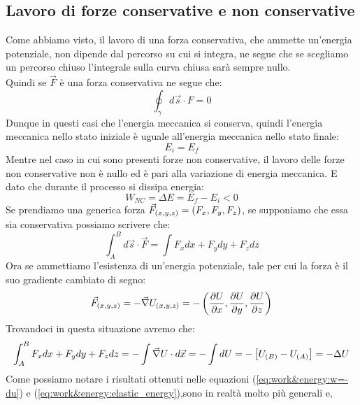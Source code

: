 \subsection{Lavoro di forze conservative e non conservative}
Come abbiamo visto, il lavoro di una forza conservativa, che ammette
un'energia potenziale, non dipende dal percorso su cui si integra, ne segue
che se scegliamo un percorso chiuso l'integrale sulla curva chiusa sarà
sempre nullo.\\
Quindi se $\vec F$ è una forza conservativa ne segue che:
\begin{equation}
    \boxed{\oint_\gamma d\vec s \cdot F = 0}
\label{eq:work&energy:conservative_force}
\end{equation}
Dunque in questi casi che l'energia meccanica si conserva, quindi l'energia
meccanica nello stato iniziale è uguale all'energia meccanica nello stato
finale:
\begin{equation}
    \boxed{E_i = E_f}
\label{eq:work&energy:Ei=Ef}
\end{equation}
Mentre nel caso in cui sono presenti forze non conservative, il lavoro delle
forze non conservative non è nullo ed è pari alla variazione di energia
meccanica. E dato che durante il processo si dissipa energia:
\begin{equation}
    \boxed{W_{NC} = \Delta E = E_f- E_i < 0}
\label{eq:work&energy:Ei>Ef}
\end{equation}
Se prendiamo una generica forza $\vec F_{\left( x,y,z\right)} = \left( F_x,F_y,F_z\right)$,
se supponiamo che essa sia conservativa possiamo scrivere che:
\begin{equation}
    \int_A^Bd\vec s\cdot \vec F = \int F_xdx+F_ydy+F_zdz
\end{equation}
Ora se ammettiamo l'esistenza di un'energia potenziale, tale per cui la forza
è il suo gradiente cambiato di segno:
\begin{equation}
    \vec F_{\left( x,y,z\right)} = -\vec\nabla U_{\left( x,y,z\right)} = -\left(\frac{\partial U}{\partial x},\frac{\partial U}{\partial y},\frac{\partial U}{\partial z}\right)
\label{eq:work&energy:gradient}
\end{equation}
Trovandoci in questa situazione avremo che:
\begin{equation}
    \int_A^B F_xdx+F_ydy+F_zdz = -\int\vec \nabla U\cdot d\vec x = -\int dU = -\left[ U_{(B)}-U_{(A)}\right] = -\Delta U
\end{equation}
Come possiamo notare i risultati ottenuti nelle equazioni (\ref{eq:work&energy:w=-du})
e (\ref{eq:work&energy:elastic_energy}),sono in realtà molto più generali e,
